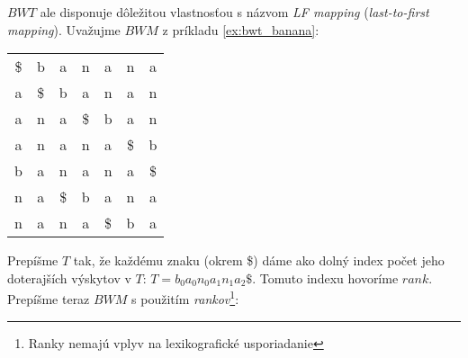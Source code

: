     $BWT$ ale disponuje dôležitou vlastnosťou s názvom \emph{LF mapping} (\emph{last-to-first mapping}). Uvažujme $BWM$ z príkladu \ref{ex:bwt_banana}:
    
    \bigskip
    \begin{center}
        \begin{tabular}{ c c c c c c c }
            \$ & b  & a  & n  & a  & n  & a  \\            
            a  & \$ & b  & a  & n  & a  & n  \\
            a  & n  & a  & \$ & b  & a  & n  \\
            a  & n  & a  & n  & a  & \$ & b  \\
            b  & a  & n  & a  & n  & a  & \$ \\
            n  & a  & \$ & b  & a  & n  & a  \\ 
            n  & a  & n  & a  & \$ & b  & a  \\
        \end{tabular}
    \end{center}    
    
    Prepíšme $T$ tak, že každému znaku (okrem \$) dáme ako dolný index počet jeho doterajších výskytov v $T$: $T = b_0a_0n_0a_{1}n_{1}a_{2}\$$. Tomuto indexu hovoríme $rank$. Prepíšme teraz $BWM$ s použitím \emph{rankov}\footnote{Ranky nemajú vplyv na lexikografické usporiadanie}:
    
